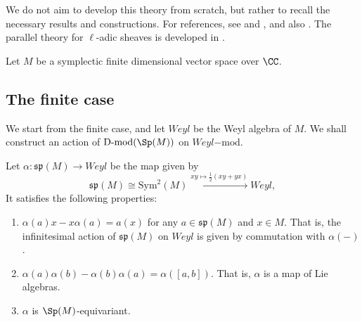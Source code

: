 \documentclass[11pt]{article}
\begin{document}
We do not aim to develop this theory from scratch, but rather to recall the necessary results and constructions. For references, see \cite[§10]{Ras2} and \cite[Lemma 2.4.1]{BDFRT}, and also \cite{Laf}.
The parallel theory for $\ell$-adic sheaves is developed in \cite{LL}.

Let $M$ be a symplectic finite dimensional vector space over $\CC$.
\subsection{The finite case}
We start from the finite case, and let $Weyl$ be the Weyl algebra of $M$.
We shall construct an action of $\operatorname{D-mod}(\Sp(M))$ on $Weyl\mathrm{-mod}$.

Let $\alpha: \mathfrak{sp}(M)\to Weyl$ be the map given by
$$\mathfrak{sp}(M)\cong \mathrm{Sym}^2(M)\xrightarrow{xy\mapsto \frac{1}{2}(xy+yx)} Weyl,$$
It satisfies the following properties:
\begin{enumerate}
    \item $\alpha(a)x - x\alpha(a) = a(x)$ for any $a\in \mathfrak{sp}(M)$ and $x\in M$. That is, the infinitesimal action of $\mathfrak{sp}(M)$ on $Weyl$ is given by commutation with $\alpha(-)$.
    \item $\alpha(a)\alpha(b) - \alpha(b)\alpha(a) = \alpha([a,b])$. That is, $\alpha$ is a map of Lie algebras.
    \item $\alpha$ is $\Sp(M)$-equivariant.
\end{enumerate}
\end{document}
